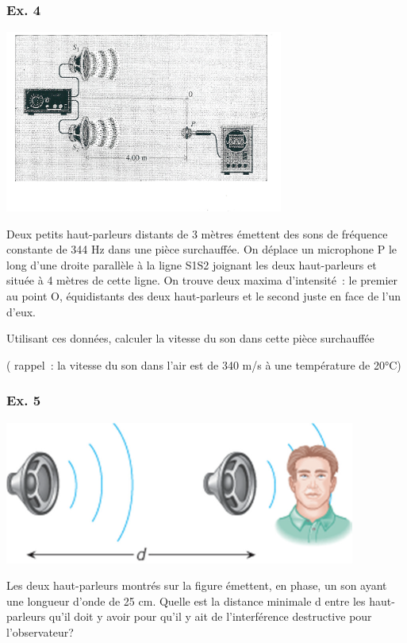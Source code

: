 {\subsubsection{Ex. 4}

\includegraphics[width=9.146cm,height=5.973cm]{Pictures/100000010000062500000404B4675BF2C4CE1EEC.png}

Deux
petits haut-parleurs distants de 3 mètres émettent des sons de fréquence
constante de 344 Hz dans une pièce surchauffée. On déplace un microphone
P le long d'une droite parallèle à la ligne S1S2 joignant les deux
haut-parleurs et située à 4 mètres de cette ligne. On trouve deux maxima
d'intensité~: le premier au point O, équidistants des deux haut-parleurs
et le second juste en face de l'un d'eux.

Utilisant ces données, calculer la vitesse du son dans cette pièce
surchauffée

( rappel~: la vitesse du son dans l'air est de 340 m/s à une température
de 20°C)

\subsubsection{Ex. 5}

\includegraphics[width=11.546cm,height=4.688cm]{Pictures/1000000100000363000001603D3E7105AB252F90.png}

Les
deux haut-parleurs montrés sur la figure émettent, en phase, un son
ayant une longueur d'onde de 25 cm. Quelle est la distance minimale d
entre les haut-parleurs qu'il doit y avoir pour qu'il y ait de
l'interférence destructive pour l'observateur?

}
